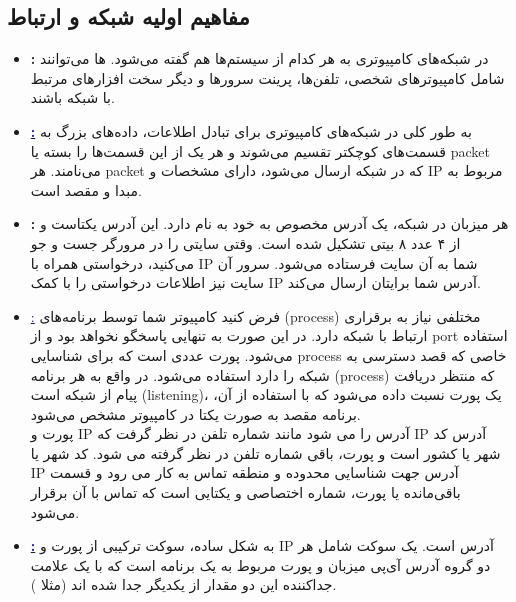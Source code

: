 \documentclass[]{article}
\newcommand{\link}[2]{\href{#1}{\textcolor{blue}{#2}}}
\begin{document}
\subsection*{{\titr مفاهیم اولیه شبکه و ارتباط}}
\begin{itemize}
	\item \textbf{:} در شبکه‌های کامپیوتری به هر کدام از سیستم‌ها  هم گفته می‌شود. ها می‌توانند شامل کامپیوترهای شخصی، تلفن‌ها، پرینت سرورها و دیگر سخت‌ افزارهای مرتبط با شبکه باشند.
	\item \link{https://en.wikipedia.org/wiki/Network_packet}{\textbf{\lr{Packet}:}} به طور کلی در شبکه‌های کامپیوتری برای تبادل اطلاعات، داده‌های بزرگ به قسمت‌های کوچکتر تقسیم می‌شوند و هر یک از این قسمت‌ها را بسته یا packet‌ می‌نامند. هر packet که در شبکه ارسال می‌شود، دارای مشخصات و IP مربوط به مبدا و مقصد است. 
	\item \textbf{:} هر میزبان در شبکه، یک آدرس مخصوص به خود به نام  دارد. این آدرس یکتاست و از ۴ عدد ۸ بیتی تشکیل شده است. وقتی سایتی را در مرورگر جست و جو می‌کنید، درخواستی همراه با IP‌ شما به آن سایت فرستاده می‌شود. سرور آن سایت نیز اطلاعات درخواستی را با کمک IP آدرس شما برایتان ارسال می‌کند.
	\item \link{https://www.cloudflare.com/learning/network-layer/what-is-a-computer-port/}{\textbf{\lr{Port}}:} فرض کنید کامپیوتر شما توسط برنامه‌های (process) مختلفی نیاز به برقراری ارتباط با شبکه دارد. در این صورت  به تنهایی پاسخگو نخواهد بود و از port استفاده می‌شود. پورت عددی است که برای شناسایی process خاصی که قصد دسترسی به شبکه را دارد استفاده می‌شود. در واقع به هر برنامه (process) که منتظر دریافت پیام از شبکه است (listening)، یک پورت نسبت داده می‌شود که با استفاده از آن، برنامه مقصد به صورت یکتا در کامپیوتر مشخص می‌شود.\\
	پورت و IP آدرس را می شود مانند شماره تلفن در نظر گرفت که IP آدرس کد شهر یا کشور است و پورت، باقی شماره تلفن در نظر گرفته می شود. کد شهر یا IP آدرس جهت شناسایی محدوده و منطقه تماس به کار می رود و قسمت باقی‌مانده یا پورت، شماره اختصاصی و یکتایی است که تماس با آن برقرار می‌شود.	
	\item \link{https://www.geeksforgeeks.org/socket-in-computer-network/}{\textbf{\lr{Socket}:}} به شکل ساده، سوکت ترکیبی از پورت و IP آدرس است. یک سوکت شامل هر دو گروه آدرس آی‌پی میزبان و پورت مربوط به یک برنامه است که با یک علامت جداکننده این دو مقدار از یکدیگر جدا شده اند (مثلا ). \\

\end{itemize}
\end{document}
